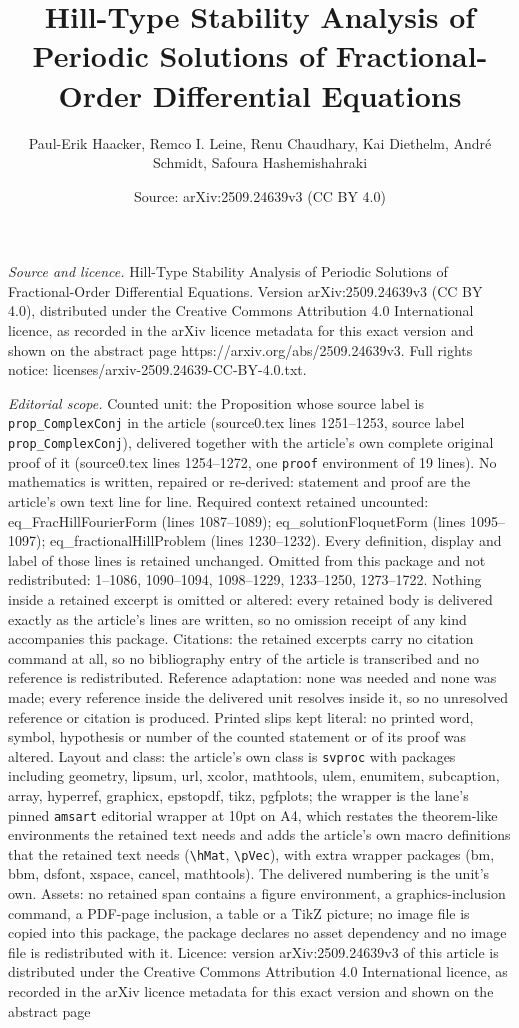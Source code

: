 \documentclass[10pt,a4paper]{amsart}
\title[Hill-Type Stability Analysis of Periodic Solutions of Fracti]{Hill-Type Stability Analysis of Periodic Solutions of Fractional-Order Differential Equations}
\author{Paul-Erik Haacker, Remco I. Leine, Renu Chaudhary, Kai Diethelm, Andr\'e Schmidt, Safoura Hashemishahraki}
\date{Source: arXiv:2509.24639v3 (CC BY 4.0)}
\begin{document}
\maketitle

\noindent\emph{Source and licence.} Hill-Type Stability Analysis of Periodic Solutions of Fractional-Order Differential Equations. Version arXiv:2509.24639v3 (CC BY 4.0), distributed under the Creative Commons Attribution 4.0 International licence, as recorded in the arXiv licence metadata for this exact version and shown on the abstract page https://arxiv.org/abs/2509.24639v3. Full rights notice: licenses/arxiv-2509.24639-CC-BY-4.0.txt.\par\smallskip

\noindent\textit{Editorial scope.} Counted unit: the Proposition whose source label is \texttt{prop\_ComplexConj} in the article (source0.tex lines 1251--1253, source label \texttt{prop\_ComplexConj}), delivered together with the article's own complete original proof of it (source0.tex lines 1254--1272, one \texttt{proof} environment of 19 lines). No mathematics is written, repaired or re-derived: statement and proof are the article's own text line for line. Required context retained uncounted: eq\_FracHillFourierForm (lines 1087--1089); eq\_solutionFloquetForm (lines 1095--1097); eq\_fractionalHillProblem (lines 1230--1232). Every definition, display and label of those lines is retained unchanged. Omitted from this package and not redistributed: 1--1086, 1090--1094, 1098--1229, 1233--1250, 1273--1722. Nothing inside a retained excerpt is omitted or altered: every retained body is delivered exactly as the article's lines are written, so no omission receipt of any kind accompanies this package. Citations: the retained excerpts carry no citation command at all, so no bibliography entry of the article is transcribed and no reference is redistributed. Reference adaptation: none was needed and none was made; every reference inside the delivered unit resolves inside it, so no unresolved reference or citation is produced. Printed slips kept literal: no printed word, symbol, hypothesis or number of the counted statement or of its proof was altered. Layout and class: the article's own class is \texttt{svproc} with packages including geometry, lipsum, url, xcolor, mathtools, ulem, enumitem, subcaption, array, hyperref, graphicx, epstopdf, tikz, pgfplots; the wrapper is the lane's pinned \texttt{amsart} editorial wrapper at 10pt on A4, which restates the theorem-like environments the retained text needs and adds the article's own macro definitions that the retained text needs (\texttt{\textbackslash hMat}, \texttt{\textbackslash pVec}), with extra wrapper packages (bm, bbm, dsfont, xspace, cancel, mathtools). The delivered numbering is the unit's own. Assets: no retained span contains a figure environment, a graphics-inclusion command, a PDF-page inclusion, a table or a TikZ picture; no image file is copied into this package, the package declares no asset dependency and no image file is redistributed with it. Licence: version arXiv:2509.24639v3 of this article is distributed under the Creative Commons Attribution 4.0 International licence, as recorded in the arXiv licence metadata for this exact version and shown on the abstract page 
\end{document}
